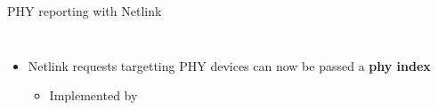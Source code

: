 \begin{frame}{PHY reporting with Netlink}
\begin{columns}
\begin{itemize}
\begin{itemize}
				\item When an SFP module is driven by a PHY, and contains a PHY itself
				\item When a PHY is used as a \textbf{media converter}
			\end{itemize}
		\item Netlink requests targetting PHY devices can now be passed a \textbf{phy index}
			\begin{itemize}
				\item Implemented by 
			\end{itemize}
	\end{itemize}
	\end{columns}
\end{frame}


